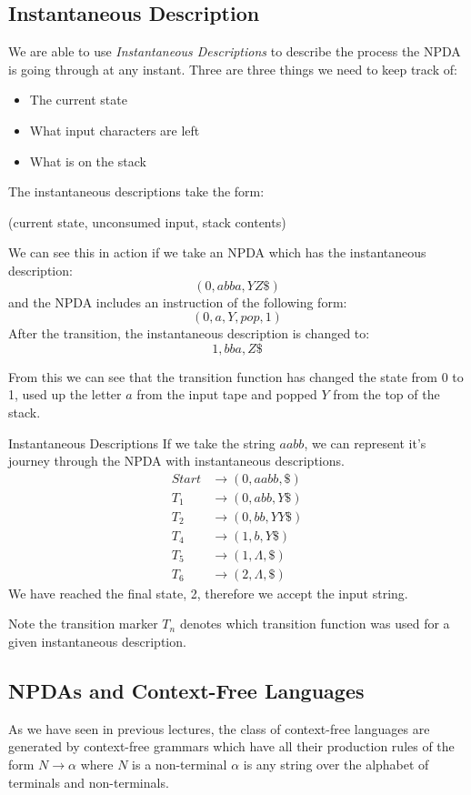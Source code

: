 \subsection{Instantaneous Description}
We are able to use \textit{Instantaneous Descriptions} to describe the process the NPDA is going through at any instant. Three are three things we need to keep track of:
\begin{itemize}
    \item The current state
    \item What input characters are left
    \item What is on the stack
\end{itemize}

The instantaneous descriptions take the form:
\begin{center}
    (current state, unconsumed input, stack contents)
\end{center}

We can see this in action if we take an NPDA which has the instantaneous description:
\[(0, abba, YZ\$)\]
and the NPDA includes an instruction of the following form:
\[(0, a, Y, pop, 1)\]
After the transition, the instantaneous description is changed to:
\[1, bba, Z\$\]

From this we can see that the transition function has changed the state from 0 to 1, used up the letter $a$ from the input tape and popped $Y$ from the top of the stack.

\begin{example}{Instantaneous Descriptions}
If we take the string $aabb$, we can represent it's journey through the NPDA with instantaneous descriptions.
\begin{align*}
    Start &\rightarrow (0, aabb, \$)\\
    T_1 &\rightarrow (0, abb, Y\$)\\
    T_2 &\rightarrow (0, bb, YY\$)\\
    T_4 &\rightarrow (1, b, Y\$)\\
    T_5 &\rightarrow (1, \Lambda, \$)\\
    T_6 &\rightarrow (2, \Lambda, \$)
\end{align*}    
We have reached the final state, 2, therefore we accept the input string.

Note the transition marker $T_n$ denotes which transition function was used for a given instantaneous description. 
\end{example}

\subsection{NPDAs and Context-Free Languages}
As we have seen in previous lectures, the class of context-free languages are generated by context-free grammars which have all their production rules of the form $N \rightarrow \alpha$ where $N$ is a non-terminal $\alpha$ is any string over the alphabet of terminals and non-terminals. 

